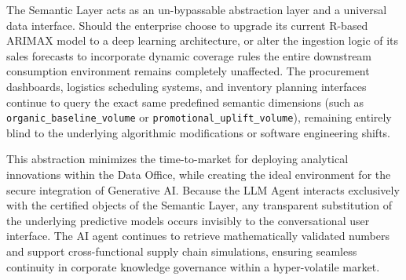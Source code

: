 The Semantic Layer acts as an un-bypassable abstraction layer and a universal data interface. Should the enterprise choose to upgrade its current R-based ARIMAX model to a deep learning architecture, or alter the ingestion logic of its sales forecasts to incorporate dynamic coverage rules %
the entire downstream consumption environment remains completely unaffected. The procurement dashboards, logistics scheduling systems, and inventory planning interfaces continue to query the exact same predefined semantic dimensions (such as \texttt{organic\_baseline\_volume} or \texttt{promotional\_uplift\_volume}), remaining entirely blind to the underlying algorithmic modifications or software engineering shifts. 

This abstraction minimizes the time-to-market for deploying analytical innovations within the Data Office, while creating the ideal environment for the secure integration of Generative AI. Because the LLM Agent interacts exclusively with the certified objects of the Semantic Layer, any transparent substitution of the underlying predictive models occurs invisibly to the conversational user interface. The AI agent continues to retrieve mathematically validated numbers and support cross-functional supply chain simulations, ensuring seamless continuity in corporate knowledge governance within a hyper-volatile market.
